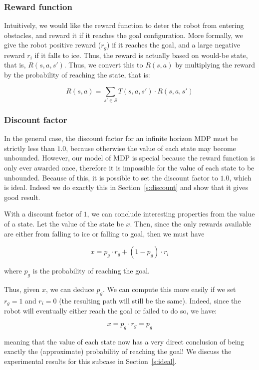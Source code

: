 \documentclass[a4paper]{article}
\begin{document}
\subsubsection{Reward function}
\label{sec:r}
Intuitively, we would like the reward function to deter the robot from entering
obstacles, and reward it if it reaches the goal configuration. More formally,
we give the robot positive reward ($r_g$) if it reaches the goal, and a large negative
reward $r_i$ if it falls to ice. Thus, the reward is actually based on would-be state,
that is, $R(s, a, s')$. Thus, we convert this to $R(s, a)$ by multiplying the
reward by the probability of reaching the state, that is:

\[ R(s, a) = \sum_{s' \in S} T(s, a, s') \cdot R(s, a, s') \]

\subsubsection{Discount factor}

In the general case, the discount factor for an infinite horizon MDP must be
strictly less than $1.0$, because otherwise the value of each state may become
unbounded. However, our model of MDP is special because the reward function is
only ever awarded once, therefore it is impossible for the value of each state
to be unbounded. Because of this, it is possible to set the discount factor to
$1.0$, which is ideal. Indeed we do exactly this in Section~\ref{s:discount}
and show that it gives good result.

With a discount factor of $1$, we can conclude interesting properties from the
value of a state. Let the value of the state be $x$. Then, since the only
rewards available are either from falling to ice or falling to goal, then we
must have

$$x = p_g \cdot r_g + (1 - p_g) \cdot r_i$$

where $p_g$ is the probability of reaching the goal.

Thus, given $x$, we can deduce $p_g$. We can compute this more easily if we
set $r_g = 1$ and $r_i = 0$ (the resulting path will still be the same).
Indeed, since the robot will eventually either reach the goal or failed to
do so, we have:

$$x = p_g \cdot r_g = p_g$$

meaning that the value of each state now has a very direct conclusion of
being exactly the (approximate) probability of reaching the goal!
We discuss the experimental results for this subcase in Section~\ref{s:ideal}.
\end{document}
